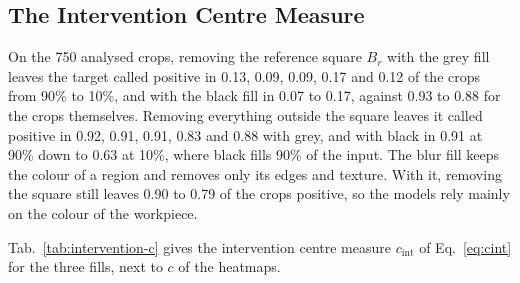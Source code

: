 \subsection{The Intervention Centre Measure}
\label{sec:results-cint}

On the 750 analysed crops, removing the reference square $B_r$ with the grey fill leaves
the target called positive in 0.13, 0.09, 0.09, 0.17 and 0.12 of the crops from 90\% to
10\%, and with the black fill in 0.07 to 0.17, against 0.93 to 0.88 for the crops
themselves. Removing everything outside the square leaves it called positive in 0.92,
0.91, 0.91, 0.83 and 0.88 with grey, and with black in 0.91 at 90\% down to 0.63 at
10\%, where black fills 90\% of the input. The blur fill keeps the colour of a region and
removes only its edges and texture. With it, removing the square still leaves 0.90 to
0.79 of the crops positive, so the models rely mainly on the colour of the workpiece.

Tab.~\ref{tab:intervention-c} gives the intervention centre measure $c_{\mathrm{int}}$
of Eq.~\eqref{eq:cint} for the three fills, next to $c$ of the heatmaps.

